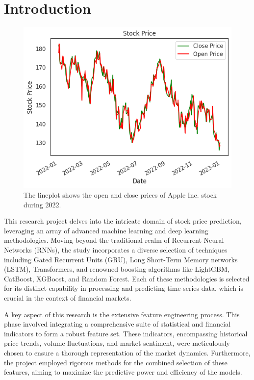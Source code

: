 \documentclass[10pt,twocolumn,letterpaper]{article}
\begin{document}
\section{Introduction}
\label{sec:intro}
\begin{figure}[t]
	\centering
	\includegraphics[width=\columnwidth]{stock}
	\caption{The lineplot shows the open and close prices of Apple Inc. stock during 2022.}
	\label{fig:stock}
\end{figure}
This research project delves into the intricate domain of stock price prediction, leveraging an array of advanced machine learning and deep learning methodologies.
Moving beyond the traditional realm of Recurrent Neural Networks (RNNs), the study incorporates a diverse selection of techniques including Gated Recurrent Units (GRU), Long Short-Term Memory networks (LSTM), Transformers, and renowned boosting algorithms like LightGBM, CatBoost, XGBoost, and Random Forest.
Each of these methodologies is selected for its distinct capability in processing and predicting time-series data, which is crucial in the context of financial markets.

A key aspect of this research is the extensive feature engineering process.
This phase involved integrating a comprehensive suite of statistical and financial indicators to form a robust feature set.
These indicators, encompassing historical price trends, volume fluctuations, and market sentiment, were meticulously chosen to ensure a thorough representation of the market dynamics.
Furthermore, the project employed rigorous methods for the combined selection of these features, aiming to maximize the predictive power and efficiency of the models.
\end{document}
